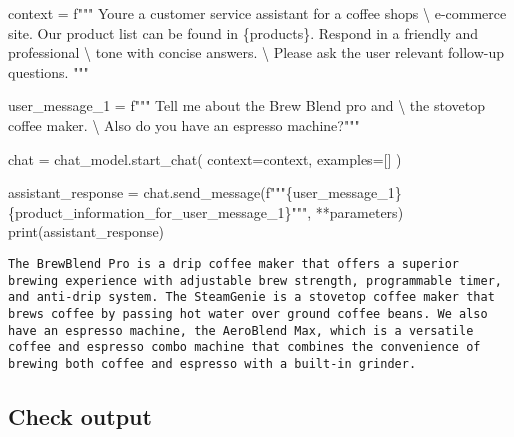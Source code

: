 \documentclass[
  letterpaper,
  DIV=11,
  numbers=noendperiod]{scrreprt}
\newenvironment{Shaded}{\begin{snugshade}}{\end{snugshade}}
\newcommand{\BuiltInTok}[1]{\textcolor[rgb]{0.00,0.23,0.31}{#1}}
\newcommand{\CharTok}[1]{\textcolor[rgb]{0.13,0.47,0.30}{#1}}
\newcommand{\NormalTok}[1]{\textcolor[rgb]{0.00,0.23,0.31}{#1}}
\newcommand{\OperatorTok}[1]{\textcolor[rgb]{0.37,0.37,0.37}{#1}}
\newcommand{\SpecialCharTok}[1]{\textcolor[rgb]{0.37,0.37,0.37}{#1}}
\newcommand{\SpecialStringTok}[1]{\textcolor[rgb]{0.13,0.47,0.30}{#1}}
\begin{document}
\begin{Shaded}
\begin{Highlighting}[]
\NormalTok{context }\OperatorTok{=} \SpecialStringTok{f"""}
\SpecialStringTok{You\textquotesingle{}re a customer service assistant for a coffee shop\textquotesingle{}s }\CharTok{\textbackslash{}}
\SpecialStringTok{e{-}commerce site. Our product list can be found in }\SpecialCharTok{\{}\NormalTok{products}\SpecialCharTok{\}}\SpecialStringTok{. Respond in a friendly and professional }\CharTok{\textbackslash{}}
\SpecialStringTok{tone with concise answers. }\CharTok{\textbackslash{}}
\SpecialStringTok{Please ask the user relevant follow{-}up questions.}
\SpecialStringTok{"""}

\NormalTok{user\_message\_1 }\OperatorTok{=} \SpecialStringTok{f"""}
\SpecialStringTok{Tell me about the Brew Blend pro and }\CharTok{\textbackslash{}}
\SpecialStringTok{the stovetop coffee maker. }\CharTok{\textbackslash{}}
\SpecialStringTok{Also do you have an espresso machine?"""}

\NormalTok{chat }\OperatorTok{=}\NormalTok{ chat\_model.start\_chat(}
\NormalTok{    context}\OperatorTok{=}\NormalTok{context,}
\NormalTok{    examples}\OperatorTok{=}\NormalTok{[]}
\NormalTok{)}

\NormalTok{assistant\_response }\OperatorTok{=}\NormalTok{ chat.send\_message(}\SpecialStringTok{f"""}\SpecialCharTok{\{}\NormalTok{user\_message\_1}\SpecialCharTok{\}\{}\NormalTok{product\_information\_for\_user\_message\_1}\SpecialCharTok{\}}\SpecialStringTok{"""}\NormalTok{, }\OperatorTok{**}\NormalTok{parameters)}
\BuiltInTok{print}\NormalTok{(assistant\_response)}
\end{Highlighting}
\end{Shaded}

\begin{verbatim}
The BrewBlend Pro is a drip coffee maker that offers a superior brewing experience with adjustable brew strength, programmable timer, and anti-drip system. The SteamGenie is a stovetop coffee maker that brews coffee by passing hot water over ground coffee beans. We also have an espresso machine, the AeroBlend Max, which is a versatile coffee and espresso combo machine that combines the convenience of brewing both coffee and espresso with a built-in grinder.
\end{verbatim}

\hypertarget{check-output}{%
\subsection{Check output}\label{check-output}}
\end{document}
